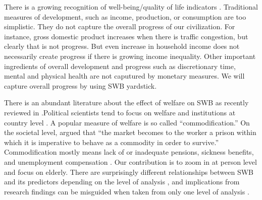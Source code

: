 \documentclass[10pt, letterpaper]{article}
\begin{document}
\begin{spacing}{1.4}
There is a growing recognition of well-being/quality of life
indicators \citep{aok_lsPol16}. Traditional
measures of development, such as income, production, or consumption are too
simplistic. They do not capture the overall progress of our civilization. For
instance, gross domestic product increases when there is traffic congestion, but
clearly that is not 
progress. But even increase in household income does not necessarily
 create progress if there is growing income inequality. 
Other important ingredients of overall development and progress such as
discretionary time, mental and physical health are not caputured by monetary measures. We will
capture overall progress by using SWB yardstick.

There is an abundant literature about the effect of welfare on SWB as recently
reviewed in \citet{aokJap14}.{Political scientists tend to focus on welfare and institutions at country
level \citep{alvarez09,pacek08b,radcliff13,pacek08r,radcliff01,bok10}. A popular measure of welfare is so called ``commodification.'' On the societal level, \citet[p. 36]{esping90} argued that ``the market becomes to the worker a prison within which it is imperative to
behave as a commodity in order to survive.''
Commodification mostly means lack of or inadequate pensions, sickness benefits,
and unemployment compensation \citep{scruggs06Ba}. Our contribution is to zoom
in at person level and focus on elderly.} %
%
 There are surprisingly different relationships between SWB and its predictors
 depending on the level of analysis \citep{ashkanasy11}, and implications from research findings can be
misguided when taken from only one level of analysis \citep{klein00}.


\end{spacing}
\end{document}
